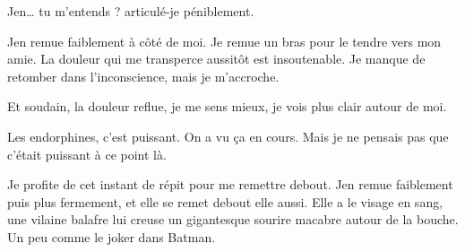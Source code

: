 \item Jen… tu m'entends ? articulé-je péniblement.

Jen remue faiblement à côté de moi. Je remue un bras pour le tendre vers mon amie. La douleur qui me transperce aussitôt est insoutenable. Je manque de retomber dans l'inconscience, mais je m'accroche.

Et soudain, la douleur reflue, je me sens mieux, je vois plus clair autour de moi.

Les endorphines, c'est puissant. On a vu ça en cours. Mais je ne pensais pas que c'était puissant à ce point là.

Je profite de cet instant de répit pour me remettre debout. Jen remue faiblement puis plus fermement, et elle se remet debout elle aussi. Elle a le visage en sang, une vilaine balafre lui creuse un gigantesque sourire macabre autour de la bouche. Un peu comme le joker dans Batman.
